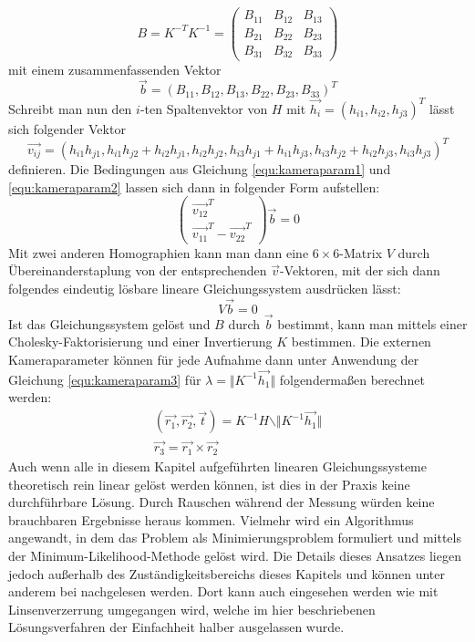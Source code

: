 \begin{equation}
	B = K^{-T}K^{-1} = \begin{pmatrix}
			B_{11} & B_{12} & B_{13} \\
			B_{21} & B_{22} & B_{23} \\
			B_{31} & B_{32} & B_{33}
		\end{pmatrix}
\end{equation}
mit einem zusammenfassenden Vektor
\begin{equation}
	\vec{b} = \left( B_{11}, B_{12}, B_{13}, B_{22}, B_{23}, B_{33} \right)^T
\end{equation}
Schreibt man nun den \(i\)-ten Spaltenvektor von \(H\) mit \(\vec{h_i} = \left( h_{i1}, h_{i2}, h_{j3} \right)^T\) lässt sich folgender Vektor 
\begin{equation}
	\vec{v_{ij}} = \left( h_{i1}h_{j1}, h_{i1}h_{j2}+h_{i2}h_{j1}, h_{i2}h_{j2},h_{i3}h_{j1}+h_{i1}h_{j3}, h_{i3}h_{j2}+h_{i2}h_{j3},h_{i3}h_{j3}\right)^T
\end{equation}
definieren. Die Bedingungen aus Gleichung \ref{equ:kameraparam1} und \ref{equ:kameraparam2} lassen sich dann in folgender Form aufstellen:
\begin{equation}
	\left( \begin{array}{c}\vec{v_{12}}^T\\\vec{v_{11}}^T - \vec{v_{22}}^T\end{array} \right)\vec{b} = 0
\end{equation}
Mit zwei anderen Homographien kann man dann eine \(6 \times 6\)-Matrix \(V\) durch Übereinanderstaplung von der entsprechenden \(\vec{v}\)-Vektoren, mit der sich dann folgendes eindeutig lösbare lineare Gleichungssystem ausdrücken lässt:
\begin{equation}
	V\vec{b} = 0
\end{equation}
Ist das Gleichungssystem gelöst und \(B\) durch \(\vec{b}\) bestimmt, kann man mittels einer Cholesky-Faktorisierung und einer Invertierung \(K\) bestimmen. Die externen Kameraparameter können für jede Aufnahme dann unter Anwendung der Gleichung \ref{equ:kameraparam3} für \(\lambda = \Vert K^{-1}\vec{h_1} \Vert\) folgendermaßen berechnet werden:
\begin{gather}
	\left(\vec{r_1},\vec{r_2},\vec{t}\right) = K^{-1}H \backslash \Vert K^{-1}\vec{h_1} \Vert \\
	\vec{r_3} = \vec{r_1} \times \vec{r_2}
\end{gather}
Auch wenn alle in diesem Kapitel aufgeführten linearen Gleichungssysteme theoretisch rein linear gelöst werden können, ist dies in der Praxis keine durchführbare Lösung. Durch Rauschen während der Messung würden keine brauchbaren Ergebnisse heraus kommen. Vielmehr wird ein Algorithmus angewandt, in dem das Problem als Minimierungsproblem formuliert und mittels der Minimum-Likelihood-Methode gelöst wird. Die Details dieses Ansatzes liegen jedoch außerhalb des Zuständigkeitsbereichs dieses Kapitels und können unter anderem bei \cite{Zhang:00} nachgelesen werden. Dort kann auch eingesehen werden wie mit Linsenverzerrung umgegangen wird, welche im hier beschriebenen Lösungsverfahren der Einfachheit halber ausgelassen wurde.

